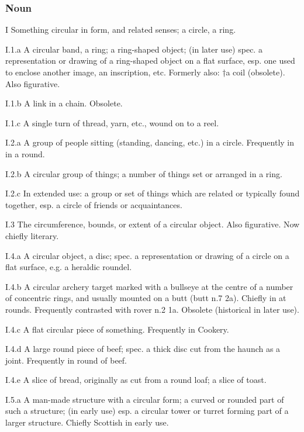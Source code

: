 	\subsubsection{Noun}

		\begin{compactitem}
			\item[I] Something circular in form, and related senses; a circle, a ring.
			\item[I.1.a] A circular band, a ring; a ring-shaped object; (in later use) spec. a representation or drawing of a ring-shaped object on a flat surface, esp. one used to enclose another image, an inscription, etc. Formerly also: †a coil (obsolete). Also figurative.
			\item[I.1.b] A link in a chain. Obsolete.
			\item[I.1.c] A single turn of thread, yarn, etc., wound on to a reel.
			\item[I.2.a] A group of people sitting (standing, dancing, etc.) in a circle. Frequently in in a round.
			\item[I.2.b] A circular group of things; a number of things set or arranged in a ring.
			\item[I.2.c] In extended use: a group or set of things which are related or typically found together, esp. a circle of friends or acquaintances.
			\item[I.3] The circumference, bounds, or extent of a circular object. Also figurative. Now chiefly literary.
			\item[I.4.a] A circular object, a disc; spec. a representation or drawing of a circle on a flat surface, e.g. a heraldic roundel. 
			\item[I.4.b] A circular archery target marked with a bullseye at the centre of a number of concentric rings, and usually mounted on a butt (butt n.7 2a). Chiefly in at rounds. Frequently contrasted with rover n.2 1a. Obsolete (historical in later use).
			\item[I.4.c] A flat circular piece of something. Frequently in Cookery.
			\item[I.4.d] A large round piece of beef; spec. a thick disc cut from the haunch as a joint. Frequently in round of beef.
			\item[I.4.e] A slice of bread, originally as cut from a round loaf; a slice of toast.
			\item[I.5.a] A man-made structure with a circular form; a curved or rounded part of such a structure; (in early use) esp. a circular tower or turret forming part of a larger structure. Chiefly Scottish in early use.

\end{compactitem}
